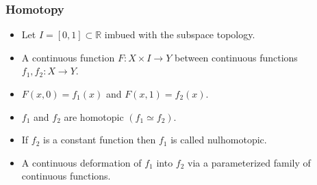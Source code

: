 \documentclass{beamer}
\newcommand{\R}{\mathbb{R}}
\begin{document}
\begin{frame}
  \frametitle{Homotopy}
  \begin{itemize}
  \item Let \(I=[0,1]\subset\R\) imbued with the subspace topology.
  \item A continuous function \(F:X\times I\to Y\) between continuous functions \(f_1,f_2:X\to Y\).
  \item \(F(x,0)=f_1(x)\) and \(F(x,1)=f_2(x)\).
  \item \(f_1\) and \(f_2\) are homotopic \((f_1\simeq f_2)\).
  \item If \(f_2\) is a constant function then \(f_1\) is called nulhomotopic.
  \item A continuous deformation of \(f_1\) into \(f_2\) via a parameterized family of continuous functions.
  \end{itemize}
\end{frame}
\end{document}
